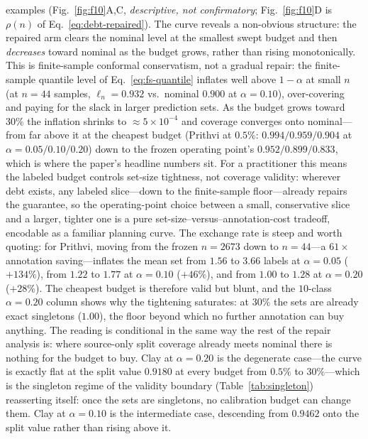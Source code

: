 \documentclass[preprint,11pt,authoryear]{elsarticle}
\begin{document}
examples (Fig.~\ref{fig:f10}A,C, \emph{descriptive, not confirmatory}; Fig.~\ref{fig:f10}D is $\rho(n)$ of
Eq.~\eqref{eq:debt-repaired}). The curve reveals a non-obvious
structure: the repaired arm clears the nominal level at the smallest swept budget and then
\emph{decreases} toward nominal as the budget grows, rather than rising monotonically. This is
finite-sample conformal conservatism, not a gradual repair: the finite-sample quantile level
of Eq.~\eqref{eq:fs-quantile} inflates well above $1{-}\alpha$ at small $n$ (at $n{=}44$
samples, $\ell_n{=}0.932$ vs.\ nominal $0.900$ at $\alpha{=}0.10$), over-covering and paying for
the slack in larger prediction sets. As the budget grows toward $30\%$ the inflation shrinks to
${\approx}5{\times}10^{-4}$ and coverage converges onto nominal---from far above it at the cheapest
budget (Prithvi at $0.5\%$: $0.994/0.959/0.904$ at $\alpha{=}0.05/0.10/0.20$) down to the frozen
operating point's $0.952/0.899/0.833$, which is where the paper's headline numbers sit.
For a practitioner this means the labeled budget controls set-size tightness, not coverage
validity: wherever debt exists, any labeled slice---down to the finite-sample floor---already repairs
the guarantee, so the operating-point choice between a small, conservative slice and a larger, tighter
one is a pure set-size--versus--annotation-cost tradeoff, encodable as a familiar planning curve. The
exchange rate is steep and worth quoting: for Prithvi, moving from the frozen $n{=}2673$ down to
$n{=}44$---a $61{\times}$ annotation saving---inflates the mean set from $1.56$ to $3.66$ labels at
$\alpha{=}0.05$ ($+134\%$), from $1.22$ to $1.77$ at $\alpha{=}0.10$ ($+46\%$), and from $1.00$ to
$1.28$ at $\alpha{=}0.20$ ($+28\%$). The cheapest budget is therefore valid but blunt, and the $10$-class
$\alpha{=}0.20$ column shows why the tightening saturates: at $30\%$ the sets are already exact
singletons ($1.00$), the floor beyond which no further annotation can buy anything. The
reading is conditional in the same way the rest of the repair analysis is: where source-only split
coverage already meets nominal there is nothing for the budget to buy. Clay at $\alpha{=}0.20$ is the
degenerate case---the curve is exactly flat at the split value $0.9180$ at every budget from $0.5\%$ to
$30\%$---which is the singleton regime of the validity boundary (Table~\ref{tab:singleton}) reasserting
itself: once the sets are singletons, no calibration budget can change them. Clay at $\alpha{=}0.10$ is
the intermediate case, descending from $0.9462$ onto the split value rather than rising above it.
\end{document}
